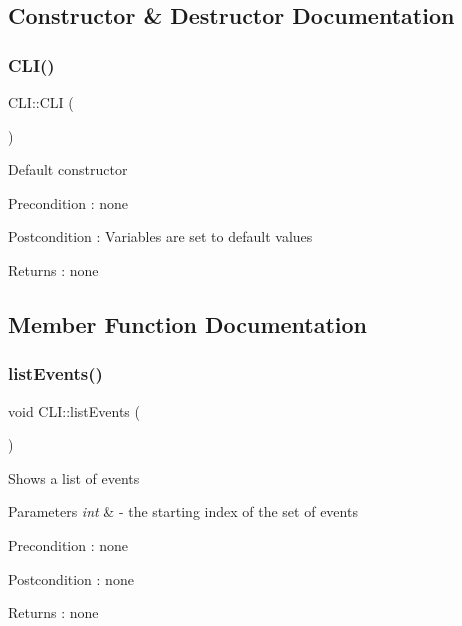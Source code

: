 \subsection{Constructor \& Destructor Documentation}
\mbox{\label{class_c_l_i_a1a5b0f7ec3b242c5c56e4745adbb391e}} 
\subsubsection{\texorpdfstring{C\+L\+I()}{CLI()}}
{\footnotesize\ttfamily C\+L\+I\+::\+C\+LI (\begin{DoxyParamCaption}{ }\end{DoxyParamCaption})}

Default constructor \begin{DoxyPrecond}{Precondition}
\+: none 
\end{DoxyPrecond}
\begin{DoxyPostcond}{Postcondition}
\+: Variables are set to default values 
\end{DoxyPostcond}
\begin{DoxyReturn}{Returns}
\+: none 
\end{DoxyReturn}


\subsection{Member Function Documentation}
\mbox{\label{class_c_l_i_a4671c459b20aadcca2b9d1ecba63ba0c}} 
\subsubsection{\texorpdfstring{list\+Events()}{listEvents()}}
{\footnotesize\ttfamily void C\+L\+I\+::list\+Events (\begin{DoxyParamCaption}{ }\end{DoxyParamCaption})}

Shows a list of events 
\begin{DoxyParams}{Parameters}
{\em int} & -\/ the starting index of the set of events \\
\hline
\end{DoxyParams}
\begin{DoxyPrecond}{Precondition}
\+: none 
\end{DoxyPrecond}
\begin{DoxyPostcond}{Postcondition}
\+: none 
\end{DoxyPostcond}
\begin{DoxyReturn}{Returns}
\+: none 
\end{DoxyReturn}
\mbox{\label{class_c_l_i_a4036374bc8e006272b17d762a2be8396}} 
